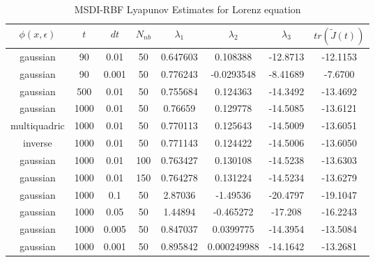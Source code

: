             \begin{table}
                \centering
                \begin{tabular}[h]{||c c c c c c c c||}
                    \hline
                    $\phi (x,\epsilon)$ & $t$ & $dt$ & $N_{nb}$ & $\lambda_1$ & $\lambda_2$ & $\lambda_3$ & $tr(\tilde{J}(t))$\\
                    \hline
                    gaussian & 90 & 0.01 & 50 & 0.647603 &   0.108388  &  -12.8713 & -12.1153\\
                    \hline
                    gaussian & 90 & 0.001 & 50 & 0.776243 & -0.0293548 & -8.41689 & -7.6700\\
                    \hline
                    gaussian & 500 & 0.01 & 50 & 0.755684 & 0.124363 & -14.3492 & -13.4692\\
                    \hline
                    gaussian & 1000 & 0.01 & 50 & 0.76659 & 0.129778 & -14.5085 & -13.6121\\
                    \hline
                    multiquadric & 1000 & 0.01 & 50 & 0.770113 & 0.125643 & -14.5009 & -13.6051\\
                    \hline
                    inverse & 1000 & 0.01 & 50 & 0.771143 & 0.124422 & -14.5006 & -13.6050\\
                    \hline
                    gaussian & 1000 & 0.01 & 100 & 0.763427 & 0.130108 & -14.5238 & -13.6303\\
                    \hline
                    gaussian & 1000 & 0.01 & 150 & 0.764278 & 0.131224 & -14.5234 & -13.6279\\
                    \hline
                    gaussian & 1000 & 0.1 & 50 & 2.87036 & -1.49536 & -20.4797 & -19.1047\\
                    \hline
                    gaussian & 1000 & 0.05 & 50 & 1.44894 & -0.465272 & -17.208 & -16.2243\\
                    \hline
                    gaussian & 1000 & 0.005 & 50 & 0.847037 & 0.0399775 & -14.3954 & -13.5084\\
                    \hline
                    gaussian & 1000 & 0.001 & 50 & 0.895842 & 0.000249988 & -14.1642 & -13.2681\\ [1ex]
                    \hline
                \end{tabular}\\
                \caption{MSDI-RBF Lyapunov Estimates for Lorenz equation}\label{table:lorenzest}
            \end{table}

